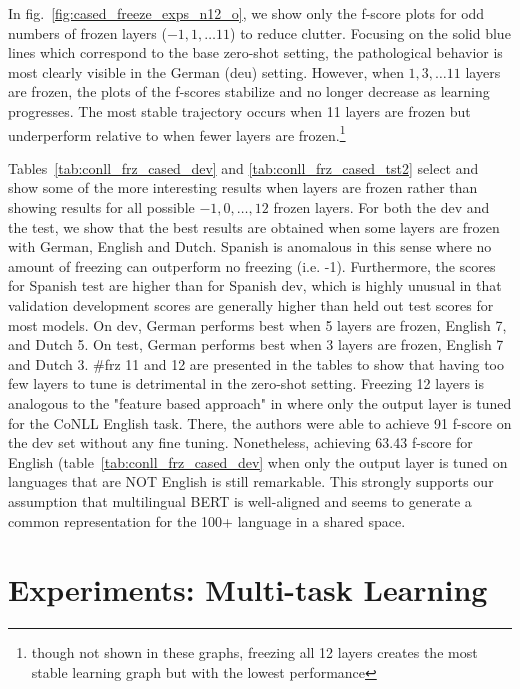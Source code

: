 \documentclass[letterpaper]{article} \usepackage{aaai20}  \usepackage{times}  \usepackage{helvet} \usepackage{courier}  \usepackage[hyphens]{url}  \usepackage{graphicx} \urlstyle{rm} \def\UrlFont{\rm}  \usepackage{graphicx}  \frenchspacing  \setlength{\pdfpagewidth}{8.5in}  \setlength{\pdfpageheight}{11in}  \usepackage{amsmath}
\begin{document}
In fig.~\ref{fig:cased_freeze_exps_n12_o}, we show only the f-score plots for odd numbers of frozen layers ($-1,1,\ldots 11$) to reduce clutter. Focusing on the solid blue lines which correspond to the base zero-shot setting, the pathological behavior is most clearly visible in the German (deu) setting. However, when $1,3,\ldots 11$ layers are frozen, the plots of the f-scores stabilize and no longer decrease as learning progresses. The most stable trajectory occurs when 11 layers are frozen but underperform relative to when fewer layers are frozen.\footnote{though not shown in these graphs, freezing all 12 layers creates the most stable learning graph but with the lowest performance}

Tables~\ref{tab:conll_frz_cased_dev} and \ref{tab:conll_frz_cased_tst2} select and show some of the more interesting results when layers are frozen rather than showing results for all possible $-1,0,\ldots,12$ frozen layers. For both the dev and the test, we show that the best results are obtained when some layers are frozen with German, English and Dutch. Spanish is anomalous in this sense where no amount of freezing can outperform no freezing (i.e. -1). Furthermore, the scores for Spanish test are higher than for Spanish dev, which is highly unusual in that validation development scores are generally higher than held out test scores for most models. On dev, German performs best when 5 layers are frozen, English 7, and Dutch 5. On test, German performs best when 3 layers are frozen, English 7 and Dutch 3. \#frz 11 and 12 are presented in the tables to show that having too few layers to tune is detrimental in the zero-shot setting. Freezing 12 layers is analogous to the "feature based approach" in \cite{BERT18} where only the output layer is tuned for the CoNLL English task. There, the authors were able to achieve 91 f-score on the dev set without any fine tuning. Nonetheless, achieving 63.43 f-score for English (table~\ref{tab:conll_frz_cased_dev} when only the output layer is tuned on languages that are NOT English is still remarkable. This strongly supports our assumption that multilingual BERT is well-aligned and seems to generate a common representation for the 100+ language in a shared space.





 \section{Experiments: Multi-task Learning}
\label{sec:exp:mult}
\end{document}
